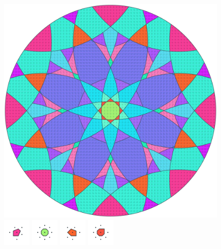 \documentclass[text.tex]{subfiles}
\begin{document}
\clearpage
\pagestyle{fancy}
\fancyhf{}
\begin{figure}[h!]
\centering
\includegraphics[width=1\textwidth]{img/results/circle8/circle8_109458_(-1136_471alpha_1).pdf}
\includegraphics[width=0.12\textwidth]{img/results/circle8/circle8_109458_(-1136_471alpha_1)_001.pdf}
\includegraphics[width=0.12\textwidth]{img/results/circle8/circle8_109458_(-1136_471alpha_1)_002.pdf}
\includegraphics[width=0.12\textwidth]{img/results/circle8/circle8_109458_(-1136_471alpha_1)_003.pdf}
\includegraphics[width=0.12\textwidth]{img/results/circle8/circle8_109458_(-1136_471alpha_1)_004.pdf}

\end{figure}
\end{document}
